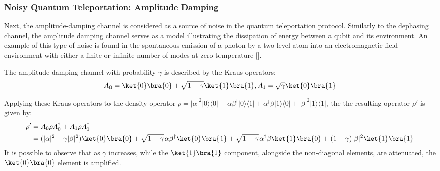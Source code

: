 \subsubsection{Noisy Quantum Teleportation: Amplitude Damping}
Next, the amplitude-damping channel is considered as a source of noise in the quantum teleportation protocol. Similarly to the dephasing channel, the amplitude damping channel serves as a model illustrating the dissipation of energy between a qubit and its environment. An example of this type of noise is found in the spontaneous emission of a photon by a two-level atom into an electromagnetic field environment with either a finite or infinite number of modes at zero temperature [\cite{salles2008experimental, Wang_2011}].


The amplitude damping channel with probability $\gamma$ is described by the Kraus operators:
\begin{equation}
     A_{0}= \ket{0} \bra{0} + \sqrt{1-\gamma} \ket{1} \bra{1} ,  A_{1}= \sqrt{\gamma} \ket{0} \bra{1}
\end{equation}

Applying these Kraus operators to the density operator $\rho=|\alpha|^{2} |0\rangle \langle 0 | + \alpha \beta^{\dag} |0\rangle \langle 1 | + \alpha^{\dag} \beta |1\rangle \langle 0 | + |\beta|^{2} |1\rangle \langle 1 |$, the the resulting operator $\rho'$ is given by:
\begin{equation} \label{eq:dephasing_result}
  \begin{split}
     \rho' & =  A_{0} \rho A_{0}^{\dag} + A_{1} \rho A_{1}^{\dag} \\
     & = (|\alpha|^{2} + \gamma |\beta|^{2}) \ket{0}\bra{0} + \sqrt{1-\gamma} \hspace{1pt} \alpha \beta^{\dag} \ket{0}\bra{1} + \sqrt{1-\gamma} \hspace{1pt} \alpha^{\dag} \beta \ket{1}\bra{0} + (1-\gamma) |\beta|^{2} \ket{1}\bra{1}
  \end{split}
\end{equation}
It is possible to observe that as $\gamma$ increases, while the $\ket{1} \bra{1}$ component, alongside the non-diagonal elements, are attenuated, the $\ket{0} \bra{0}$ element is amplified. 

